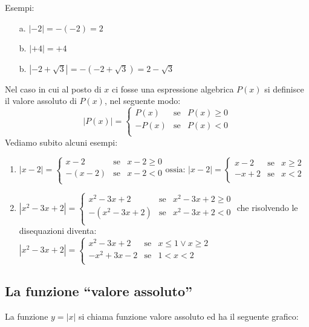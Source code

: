 Esempi:
\begin{enumerate}
\item[a.]
$|-2|=-(-2)=2$
\item[b.]
$|+4|=+4$
\item[b.]
$|-2+\sqrt{3}|=-(-2+\sqrt{3})=2-\sqrt{3}$
\end{enumerate} 
Nel caso in cui al posto di $x$ ci fosse una espressione algebrica  $P(x)$ si 
definisce il valore assoluto di $P(x)$, nel seguente modo:
$$|P(x)|=\left\lbrace 
\begin{array}{lcl}
P(x) & \text{se} & P(x)\geq 0 \\
-P(x) & \text{se} & P(x)< 0 \\
\end{array}
\right. 
$$
Vediamo subito alcuni esempi:
\begin{enumerate}
\item
$|x-2|=\left\lbrace 
\begin{array}{lcl}
x-2 & \text{se} & x-2\geq 0 \\
-(x-2) & \text{se} & x-2< 0 \\
\end{array}
\right.
\text{ossia: }
|x-2|=\left\lbrace 
\begin{array}{lcl}
x-2 & \text{se} & x\geq 2 \\
-x+2 & \text{se} & x<2 \\
\end{array}
\right.
$
\item
$|x^2-3x+2|=\left\lbrace 
\begin{array}{lcl}
x^2-3x+2 & \text{se} & x^2-3x+2\geq 0 \\
-(x^2-3x+2) & \text{se} & x^2-3x+2< 0 \\
\end{array}
\right.$
che risolvendo le disequazioni diventa:\\
$
|x^2-3x+2|=\left\lbrace 
\begin{array}{lcl}
x^2-3x+2 & \text{se} & x\leq 1 \vee x\geq 2 \\
-x^2+3x-2 & \text{se} & 1<x<2 \\
\end{array}
\right.
$
\end{enumerate}
\subsection{La funzione \textquotedblleft valore assoluto\textquotedblright}
La funzione $y=|x|$ si chiama funzione valore assoluto ed ha il seguente 
grafico:

